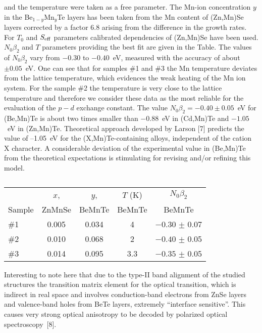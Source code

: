\documentclass[a4paper,draft]{book}
\begin{document}
and the temperature were taken as a free parameter.
The Mn-ion concentration $y$ in the Be$_{1-y}$Mn$_{y}$Te layers has been
taken from the Mn content of (Zn,Mn)Se layers corrected by a
factor 6.8 arising from the difference in the growth rates.
For $T_0 $ and $S_{\rm eff} $ parameters calibrated dependencies of
(Zn,Mn)Se have been used.
$N_0 \beta _2 $ and $T$ parameters providing the best fit are given in the Table.
The values of $N_0 \beta_2 $ vary from $-0.30$ to $-0.40$~eV, measured with the accuracy
of about $\pm 0.05$~eV.
One can see that for samples {\#}1 and {\#}3 the Mn temperature deviates from the lattice temperature,
which evidences the weak heating of the Mn ion system.
For the sample {\#}2 the temperature is very close to the lattice
temperature and therefore we consider these data as the most
reliable for the evaluation of the $p{-}d$ exchange constant.
The value $N_0 \beta_2 = -0.40\pm 0.05$~eV for (Be,Mn)Te is about two
times smaller than $-0.88$~eV in (Cd,Mn)Te and $-1.05$~eV in (Zn,Mn)Te.
Theoretical approach developed by Larson \etal{}
[7] predicts the value of --1.05~eV for the (X,Mn)Te-containing
alloys, independent of the cation X character.
A considerable deviation of the experimental value in (Be,Mn)Te from the
theoretical expectations is stimulating for revising and/or
refining this model.

\begin{table}[h]
\vspace{-12pt}
\caption{}
\begin{center}
\begin{tabular}
{lcccc}
\hline
                &$x$,       &$y$,       &$T$ (K)    &$N_0 \beta _2$  \\
Sample          &ZnMnSe     &BeMnTe     &BeMnTe     &BeMnTe\\
\hline
\vspace{4pt}
{\#}1           & 0.005     & 0.034     & 4         &$-0.30$ $\pm $ 0.07 \\
{\#}2           & 0.010     & 0.068     & 2         &$-0.40$ $\pm $ 0.05 \\
{\#}3           & 0.014     & 0.095     & 3.3       &$-0.35$ $\pm $ 0.05 \\
\hline
\end{tabular}
\end{center}
\vspace{-12pt}
\end{table}

Interesting to note here that due to the type-II band alignment of
the studied structures the transition matrix element for the
optical transition, which is indirect in real space and involves
conduction-band electrons from ZnSe layers and va\-len\-ce-band holes
from BeTe layers, extremely ``interface sensitive''. This causes
very strong optical anisotropy to be decoded by polarized optical
spectroscopy~[8].
\end{document}
